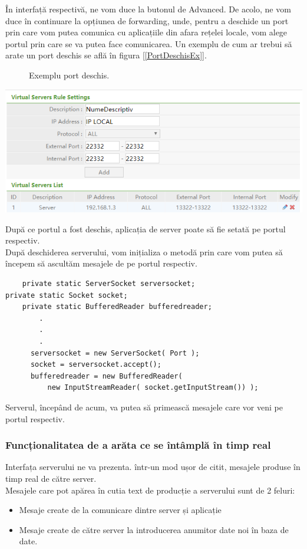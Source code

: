 \documentclass{article}
\begin{document}
			În interfață respectivă, ne vom duce la butonul de Advanced. De acolo, ne vom duce în continuare la opțiunea de forwarding, unde, pentru a deschide un port prin care vom putea comunica cu aplicațiile din afara rețelei locale, vom alege portul prin care se va putea face comunicarea. Un exemplu de cum ar trebui să arate un port deschis se află în figura [\ref{PortDeschisEx}].

	\begin{center}
		\begin{figure}[!h]
			{\caption*{Exemplu port deschis.}}
		\end{figure}
		\includegraphics[scale=0.7]{Source/PortOpened}
	\end{center}\label{PortDeschisEx}
		
	După ce portul a fost deschis, aplicația de server poate să fie setată pe portul respectiv. \\
	După deschiderea serverului, vom inițializa o metodă prin care vom putea să începem să ascultăm mesajele de pe portul respectiv.\\

	\begin{verbatim}
	private static ServerSocket serversocket;
private static Socket socket;	
	private static BufferedReader bufferedreader;
		.
		.
		.
	  serversocket = new ServerSocket( Port );
	  socket = serversocket.accept();
	  bufferedreader = new BufferedReader( 
		  new InputStreamReader( socket.getInputStream()) );
	\end{verbatim}

		  Serverul, începând de acum, va putea să primească mesajele care vor veni pe portul respectiv.

			\subsubsection{Funcționalitatea de a arăta ce se întâmplă în timp real}
		Interfața serverului ne va prezenta. într-un mod ușor de citit, mesajele produse în timp real de către server. \\
		Mesajele care pot apărea în cutia text de producție a serverului sunt de 2 feluri:
	\begin{itemize}
		\item Mesaje create de la comunicare dintre server și aplicație
		\item Mesaje create de către server la introducerea anumitor date noi în baza de date.
	\end{itemize}
\end{document}
